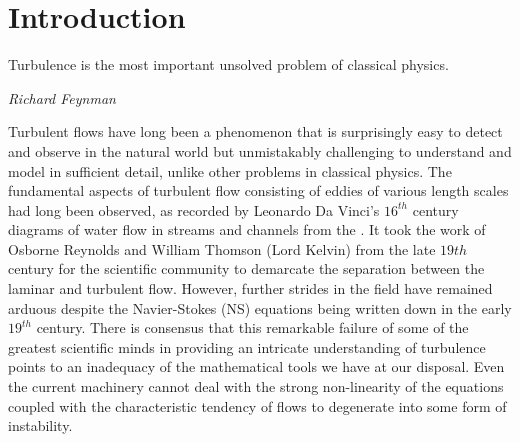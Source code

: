 \chapter{Introduction} %
\label{Chapter1}

\epigraph{Turbulence is the most important unsolved problem of classical physics.}{\textit{Richard Feynman}}

Turbulent flows have long been a phenomenon that is surprisingly easy to detect and observe in the natural world but unmistakably challenging to understand and model in sufficient detail, unlike other problems in classical physics.
The fundamental aspects of turbulent flow consisting of eddies of various length scales had long been observed, as recorded by Leonardo Da Vinci's $16^{th}$ century diagrams of water flow in streams and channels from the  \parencite{Colagrossi2021DaVinci}.
It took the work of Osborne Reynolds and William Thomson (Lord Kelvin) from the late $19th$ century for the scientific community to demarcate the separation between the laminar and turbulent flow. However, further strides in the field have remained arduous despite the Navier-Stokes (NS) equations being written down in the early $19^{th}$ century. There is consensus that this remarkable failure of some of the greatest scientific minds in providing an intricate understanding of turbulence points to an inadequacy of the mathematical tools we have at our disposal. Even the current machinery cannot deal with the strong non-linearity of the equations coupled with the characteristic tendency of flows to degenerate into some form of instability.

